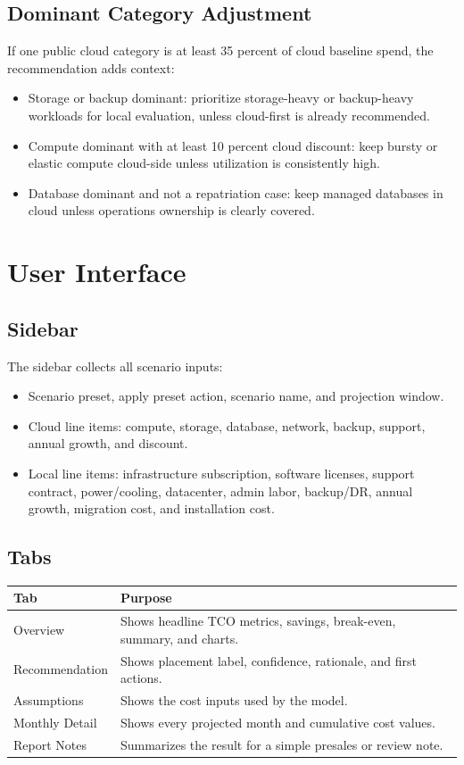 \documentclass[11pt,a4paper]{article}
\begin{document}
\subsection{Dominant Category Adjustment}

If one public cloud category is at least 35 percent of cloud baseline spend, the recommendation adds context:

\begin{itemize}
  \item Storage or backup dominant: prioritize storage-heavy or backup-heavy workloads for local evaluation, unless cloud-first is already recommended.
  \item Compute dominant with at least 10 percent cloud discount: keep bursty or elastic compute cloud-side unless utilization is consistently high.
  \item Database dominant and not a repatriation case: keep managed databases in cloud unless operations ownership is clearly covered.
\end{itemize}

\section{User Interface}

\subsection{Sidebar}

The sidebar collects all scenario inputs:

\begin{itemize}
  \item Scenario preset, apply preset action, scenario name, and projection window.
  \item Cloud line items: compute, storage, database, network, backup, support, annual growth, and discount.
  \item Local line items: infrastructure subscription, software licenses, support contract, power/cooling, datacenter, admin labor, backup/DR, annual growth, migration cost, and installation cost.
\end{itemize}

\subsection{Tabs}

\begin{longtable}{p{}p{}}
\toprule
\textbf{Tab} & \textbf{Purpose} \\
\midrule
Overview & Shows headline TCO metrics, savings, break-even, summary, and charts. \\
Recommendation & Shows placement label, confidence, rationale, and first actions. \\
Assumptions & Shows the cost inputs used by the model. \\
Monthly Detail & Shows every projected month and cumulative cost values. \\
Report Notes & Summarizes the result for a simple presales or review note. \\
\bottomrule
\end{longtable}
\end{document}
